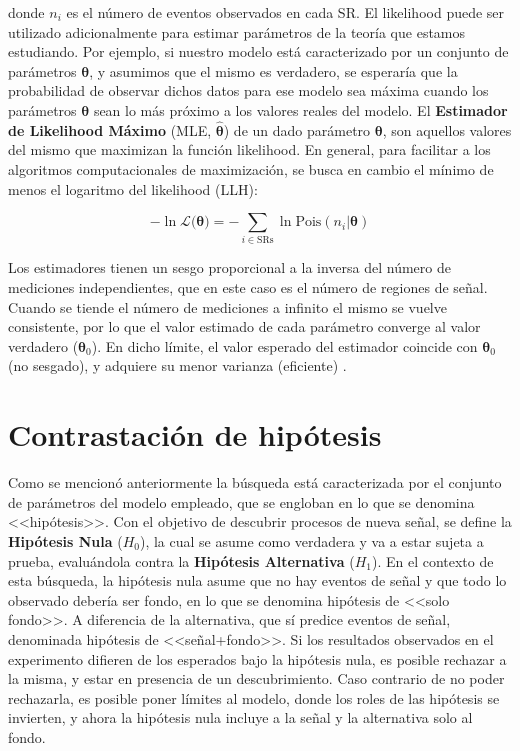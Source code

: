 \noindent donde $n_i$ es el número de eventos observados en cada SR. 
El likelihood puede ser utilizado adicionalmente para estimar parámetros de la teoría que estamos estudiando. Por ejemplo, si nuestro modelo está caracterizado por un conjunto de parámetros $\bm{\theta}$, y asumimos que el mismo es verdadero, se esperaría que la probabilidad de observar dichos datos para ese modelo sea máxima cuando los parámetros $\bm{\theta}$ sean lo más próximo a los valores reales del modelo. El \textbf{Estimador de Likelihood Máximo} (MLE, $\hat{\bm{\theta}}$) de un dado parámetro $\bm{\theta}$, son aquellos valores del mismo que maximizan la función likelihood. En general, para facilitar a los algoritmos computacionales de maximización, se busca en cambio el mínimo de menos el logaritmo del likelihood (LLH):

\begin{equation}
	-\ln{\mathcal{L}(\bm{\theta}}) = - \sum_{i\in \text{SRs}}\ln{\text{Pois}(n_i|\bm{\theta})}
\end{equation}

Los estimadores tienen un sesgo proporcional a la inversa del número de mediciones independientes, que en este caso es el número de regiones de señal. Cuando se tiende el número de mediciones a infinito el mismo se vuelve consistente, por lo que el valor estimado de cada parámetro converge al valor verdadero ($\bm{\theta}_0$). En dicho límite, el valor esperado del estimador coincide con $\bm{\theta}_0$ (no sesgado), y adquiere su menor varianza (eficiente) \cite{cowan_book}.



\section{Contrastación de hipótesis}

Como se mencionó anteriormente la búsqueda está caracterizada por el conjunto de parámetros del modelo empleado, que se engloban en lo que se denomina <<hipótesis>>. Con el objetivo de descubrir procesos de nueva señal, se define la \textbf{Hipótesis Nula} ($H_0$), la cual se asume como verdadera y va a estar sujeta a prueba, evaluándola contra la \textbf{Hipótesis Alternativa} ($H_1$). En el contexto de esta búsqueda, la hipótesis nula asume que no hay eventos de señal y que todo lo observado debería ser fondo, en lo que se denomina hipótesis de <<solo fondo>>. A diferencia de la alternativa, que sí predice eventos de señal, denominada hipótesis de <<señal+fondo>>. Si los resultados observados en el experimento difieren de los esperados bajo la hipótesis nula, es posible rechazar a la misma, y estar en presencia de un descubrimiento. Caso contrario de no poder rechazarla, es posible poner límites al modelo, donde los roles de las hipótesis se invierten, y ahora la hipótesis nula incluye a la señal y la alternativa solo al fondo.

